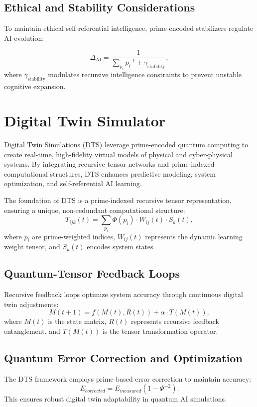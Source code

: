\documentclass{article}
\theoremstyle{plain}
\begin{document}
\begin{itemize}
\begin{itemize}
\subsection{Ethical and Stability Considerations}

To maintain ethical self-referential intelligence, prime-encoded stabilizers regulate AI evolution:

\begin{equation}
    \Delta_{\text{AI}} = \frac{1}{\sum_{p_i} p_i^{-1} + \gamma_{\text{stability}}},
\end{equation}
where $\gamma_{\text{stability}}$ modulates recursive intelligence constraints to prevent unstable cognitive expansion.


\section{Digital Twin Simulator}

Digital Twin Simulations (DTS) leverage prime-encoded quantum computing to create real-time, high-fidelity virtual models of physical and cyber-physical systems. By integrating recursive tensor networks and prime-indexed computational structures, DTS enhances predictive modeling, system optimization, and self-referential AI learning.

The foundation of DTS is a prime-indexed recursive tensor representation, ensuring a unique, non-redundant computational structure:
\begin{equation}
    T_{ijk}(t) = \sum_{p_i} \Phi(p_i) \cdot W_{ij}(t) \cdot S_k(t),
\end{equation}
where $p_i$ are prime-weighted indices, $W_{ij}(t)$ represents the dynamic learning weight tensor, and $S_k(t)$ encodes system states.

\subsection{Quantum-Tensor Feedback Loops}
Recursive feedback loops optimize system accuracy through continuous digital twin adjustments:
\begin{equation}
    M(t+1) = f(M(t), R(t)) + \alpha \cdot T(M(t)),
\end{equation}
where $M(t)$ is the state matrix, $R(t)$ represents recursive feedback entanglement, and $T(M(t))$ is the tensor transformation operator.

\subsection{Quantum Error Correction and Optimization}
The DTS framework employs prime-based error correction to maintain accuracy:
\begin{equation}
    E_{corrected} = E_{measured} (1 - \Phi^{-2}).
\end{equation}
This ensures robust digital twin adaptability in quantum AI simulations.


\end{itemize}
\end{itemize}
\end{document}
